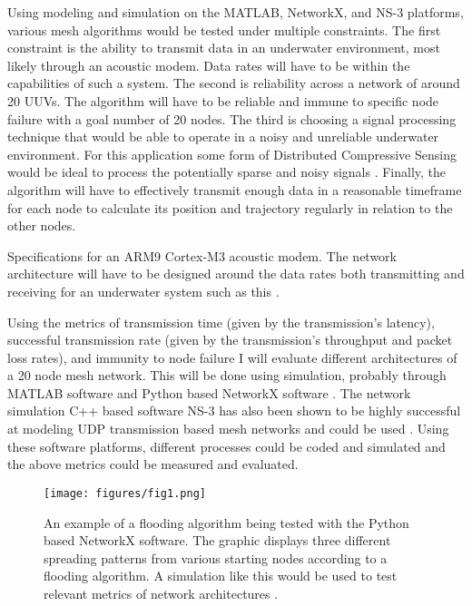 \documentclass[10pt]{article}
\begin{document}
Using modeling and simulation on the MATLAB, NetworkX, and NS-3 platforms, various mesh algorithms would be tested under multiple constraints. The first constraint is the ability to transmit data in an underwater environment, most likely through an acoustic modem. Data rates will have to be within the capabilities of such a system. The second is reliability across a network of around 20 UUVs. The algorithm will have to be reliable and immune to specific node failure with a goal number of 20 nodes. The third is choosing a signal processing technique that would be able to operate in a noisy and unreliable underwater environment. For this application some form of Distributed Compressive Sensing would be ideal to process the potentially sparse and noisy signals \cite{baron2009distributed}. Finally, the algorithm will have to effectively transmit enough data in a reasonable timeframe for each node to calculate its position and trajectory regularly in relation to the other nodes. 
\begin{table}[h]
\caption{Specifications for an ARM9 Cortex-M3 acoustic modem. The network architecture will have to be designed around the data rates both transmitting and receiving for an underwater system such as this \cite{arm2013acoustic}.}
\label{tab:1}
\begin{center}

\end{center}
\end{table}

Using the metrics of transmission time (given by the transmission’s latency), successful transmission rate (given by the transmission’s throughput and packet loss rates), and immunity to node failure I will evaluate different architectures of a 20 node mesh network. This will be done using simulation, probably through MATLAB software and Python based NetworkX software \cite{hagberg2008exploring}. The network simulation C++ based software NS-3 has also been shown to be highly successful at modeling UDP transmission based mesh networks and could be used \cite{dugaev2020wireless}. Using these software platforms, different processes could be coded and simulated and the above metrics could be measured and evaluated.
\begin{figure}[t]
\begin{center}
\texttt{[image: figures/fig1.png]}
\end{center}
\caption{An example of a flooding algorithm being tested with the Python based NetworkX software. The graphic displays three different spreading patterns from various starting nodes according to a flooding algorithm. A simulation like this would be used to test relevant metrics of network architectures \cite{sphyce2015networkx}.}
\label{fig:2}
\end{figure}
\end{document}
